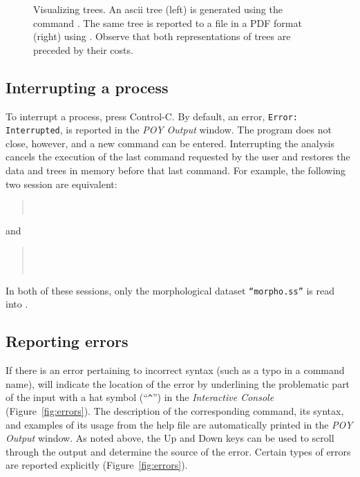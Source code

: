 {\begin{figure}
\begin{minipage}[c]{0.5\textwidth}
   	\end{minipage}
\caption{Visualizing trees. An ascii tree (left) is generated using the command
. The same tree is reported to a file in a PDF format (right) using 
. Observe that both representations of trees  are preceded by their costs.}
\label{fig:trees}
\end{figure}

\subsection{Interrupting a process}
To interrupt a process, press Control-C. By default, an error, \texttt{Error:}\\ \texttt{Interrupted}, is reported in the 
\emph{POY Output} window. The program does not close, however, and a new command can be entered. Interrupting 
the analysis cancels the execution of the last command requested by the user and restores the data and trees in memory 
before that last command. For example, the following two session are equivalent: 

\begin{quote}
 	 \\
\end{quote}
and

\begin{quote}
 	 \\
	 \\
\end{quote}

In both of these sessions, only the morphological dataset \texttt{``morpho.ss''} is read into \poy.

\subsection{Reporting errors}
If there is an error pertaining to incorrect syntax (such as a typo in a command name), \poy will indicate the location 
of the error by underlining the problematic part of the input with a hat symbol (``\texttt{\^}'') in the \emph{Interactive Console} 
(Figure~\ref{fig:errors}). The description of the corresponding command, its syntax, and examples of its usage 
from the help file are automatically printed in the \emph{POY Output} window. As noted above, the Up and Down 
keys can be used to scroll through the output and determine the source of the error. Certain types of errors are reported 
explicitly (Figure~\ref{fig:errors}).

}
